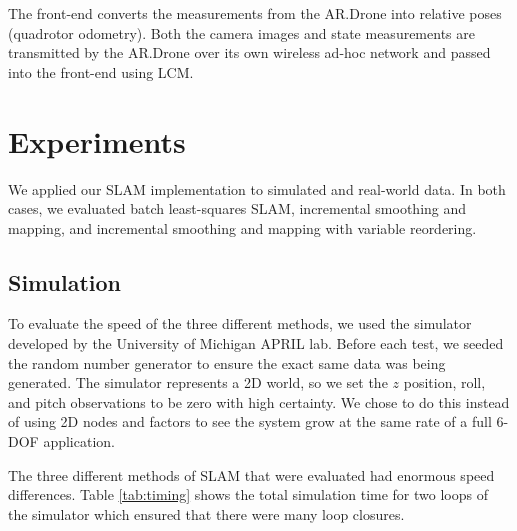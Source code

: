 \documentclass[conference]{IEEEtran}
\begin{document}

The front-end converts the measurements from the AR.Drone into relative poses (quadrotor
odometry). Both the camera images and state measurements are transmitted by the AR.Drone
over its own wireless ad-hoc network and passed into the front-end using LCM.


\section{Experiments}
\label{sec:experiments}

We applied our \ac{SLAM} implementation to simulated and real-world data. In both cases, we
evaluated batch least-squares \ac{SLAM}, incremental smoothing and mapping, and incremental
smoothing and mapping with variable reordering. 

\subsection{Simulation}
\label{sub:simulation}


To evaluate the speed of the three different methods, we used the simulator developed by
the University of Michigan APRIL lab. Before each test, we seeded the random number
generator to ensure the exact same data was being generated. The simulator represents a 2D
world, so we set the $z$ position, roll, and pitch observations to be zero with high
certainty. We chose to do this instead of using 2D nodes and factors to see the system
grow at the same rate of a full 6-\ac{DOF} application.

The three different methods of \ac{SLAM} that were evaluated had enormous speed
differences. Table \ref{tab:timing} shows the total simulation time for two loops of the
simulator which ensured that there were many loop closures.
\end{document}
